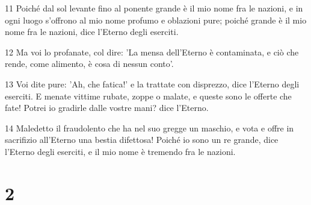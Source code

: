 \par 11 Poiché dal sol levante fino al ponente grande è il mio nome fra le nazioni, e in ogni luogo s'offrono al mio nome profumo e oblazioni pure; poiché grande è il mio nome fra le nazioni, dice l'Eterno degli eserciti.
\par 12 Ma voi lo profanate, col dire: 'La mensa dell'Eterno è contaminata, e ciò che rende, come alimento, è cosa di nessun conto'.
\par 13 Voi dite pure: 'Ah, che fatica!' e la trattate con disprezzo, dice l'Eterno degli eserciti. E menate vittime rubate, zoppe o malate, e queste sono le offerte che fate! Potrei io gradirle dalle vostre mani? dice l'Eterno.
\par 14 Maledetto il fraudolento che ha nel suo gregge un maschio, e vota e offre in sacrifizio all'Eterno una bestia difettosa! Poiché io sono un re grande, dice l'Eterno degli eserciti, e il mio nome è tremendo fra le nazioni.

\chapter{2}


